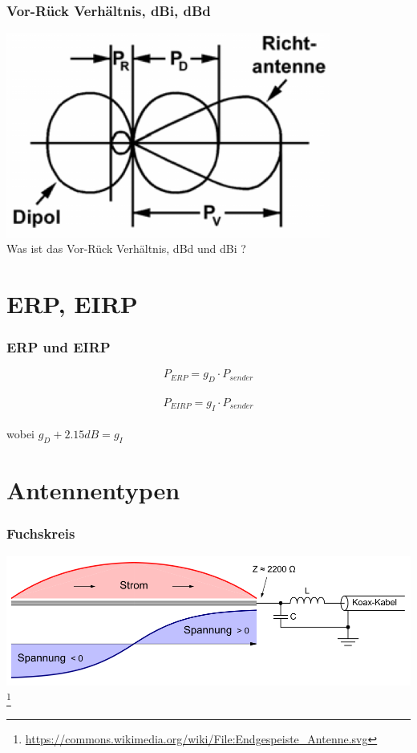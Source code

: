 \begin{frame}
    \frametitle{Vor-Rück Verhältnis, dBi, dBd}
    \begin{center}
        \includegraphics[width=0.8\textwidth]{a09/TH206.png}
        \tiny \hyperlink{refs}{\cite{bna}} \\[1em] \large Was ist das Vor-Rück Verhältnis, dBd und dBi ?
    \end{center}
\end{frame}


\section*{ERP, EIRP}

\begin{frame}
    \frametitle{ERP und EIRP}
    \begin{center}
    \Large $$P_{ERP} = g_{D} \cdot P_{sender}$$ \\
    $$P_{EIRP} = g_{I} \cdot P_{sender}$$ \\ 
    wobei $g_D + 2.15dB = g_I$
    \end{center}
\end{frame}

\section*{Antennentypen}

\begin{frame}
    \frametitle{Fuchskreis}
    \begin{center}
        \includegraphics[width=1\textwidth]{a09/1000px-Endgespeiste_Antenne.png}
        \footnote{\tiny \url{https://commons.wikimedia.org/wiki/File:Endgespeiste_Antenne.svg}}
	\end{center}
\end{frame}

